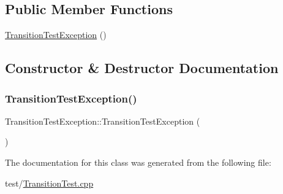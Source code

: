 \subsection*{Public Member Functions}
\begin{DoxyCompactItemize}
\item 
\mbox{\hyperlink{class_transition_test_exception_ae40e9859216d9041a356cec6b7ea90ba}{Transition\+Test\+Exception}} ()
\end{DoxyCompactItemize}


\subsection{Constructor \& Destructor Documentation}
\mbox{\label{class_transition_test_exception_ae40e9859216d9041a356cec6b7ea90ba}} 
\subsubsection{\texorpdfstring{Transition\+Test\+Exception()}{TransitionTestException()}}
{\footnotesize\ttfamily Transition\+Test\+Exception\+::\+Transition\+Test\+Exception (\begin{DoxyParamCaption}{ }\end{DoxyParamCaption})\hspace{0.3cm}{\ttfamily [inline]}}



The documentation for this class was generated from the following file\+:\begin{DoxyCompactItemize}
\item 
test/\mbox{\hyperlink{_transition_test_8cpp}{Transition\+Test.\+cpp}}\end{DoxyCompactItemize}
